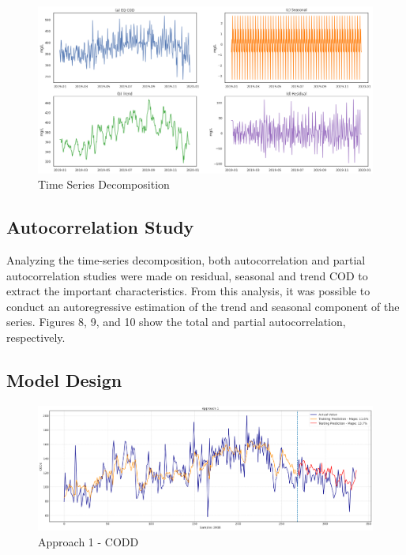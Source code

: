 \begin{figure}[h]
\centering
\includegraphics[width=\linewidth]{figures/Ch4/time_series_descompose.png}
\caption{Time Series Decomposition}
\label{f:Time-series-decomposition}
\end{figure}

\subsection{Autocorrelation Study}
Analyzing the time-series decomposition, both autocorrelation and partial autocorrelation studies were made on residual, seasonal and trend COD to extract the important characteristics. From this analysis, it was possible to conduct an autoregressive estimation of the trend and seasonal component of the series. Figures 8, 9, and 10 show the total and partial autocorrelation, respectively. 
\subsection{Model Design}

\newpage
\begin{figure}[h]
\centering
\includegraphics[width=\linewidth]{figures/Ch4/CODd-1.png}
\caption{Approach 1 - CODD}
\label{f:App1-codd}
\end{figure}

